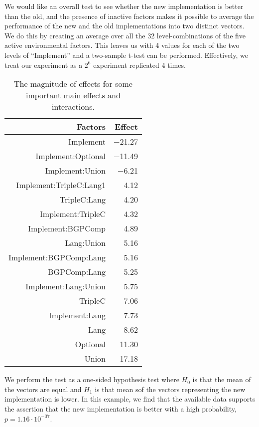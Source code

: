 \documentclass{llncs}
\begin{document}
We would like an overall test to see whether the new implementation is
better than the old, and the presence of inactive factors makes it
possible to average the performance of the new and the old
implementations into two distinct vectors. We do this by creating an
average over all the 32 level-combinations of the five active
environmental factors. This leaves us with 4 values for each of the
two levels of ``Implement'' and a two-sample t-test can be
performed. Effectively, we treat our experiment as a $2^6$ experiment
replicated 4 times.
\begin{wraptable}{l}{0.48\textwidth}
\caption{The magnitude of effects for some important main effects and interactions.}\label{tab:effects}
\bigskip\bigskip
\begin{tabular}{rr}
  \hline
Factors & Effect  \\ 
  \hline
Implement & $-$21.27 \\ 
  Implement:Optional & $-$11.49 \\ 
  Implement:Union & $-$6.21 \\ 
  Implement:TripleC:Lang1 & 4.12 \\ 
  TripleC:Lang & 4.20 \\ 
  Implement:TripleC & 4.32 \\ 
  Implement:BGPComp & 4.89 \\ 
  Lang:Union & 5.16 \\ 
  Implement:BGPComp:Lang & 5.16 \\ 
  BGPComp:Lang & 5.25 \\ 
  Implement:Lang:Union & 5.75 \\ 
  TripleC & 7.06 \\ 
  Implement:Lang & 7.73 \\ 
  Lang & 8.62 \\ 
  Optional & 11.30 \\ 
  Union & 17.18 \\ 
   \hline
\end{tabular}
\end{wraptable}

We perform the test as a one-sided hypothesis test where $H_0$ is that
the mean of the vectors are equal and $H_1$ is that mean sof the
vectors representing the new implementation is lower. In this example,
we find that the available data supports the assertion that the new
implementation is better with a high probability, $p=1.16 \cdot
10^{-07}$.
\end{document}
